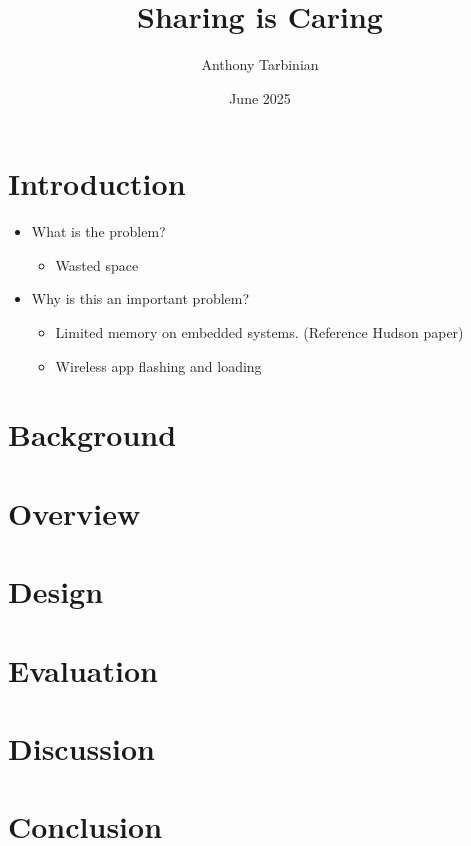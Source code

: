 \documentclass{article}
\title{Sharing is Caring}
\author{Anthony Tarbinian}
\date{June 2025}
\begin{document}
\maketitle

\section*{Introduction}

\begin{itemize}
    \item What is the problem?
        \begin{itemize}
            \item Wasted space
        \end{itemize}
    \item Why is this an important problem?
        \begin{itemize}
            \item Limited memory on embedded systems. (Reference Hudson paper)
            \item Wireless app flashing and loading
        \end{itemize}
\end{itemize}

\section*{Background}

\section*{Overview}

\section*{Design}

\section*{Evaluation}

\section*{Discussion}

\section*{Conclusion}
\end{document}
